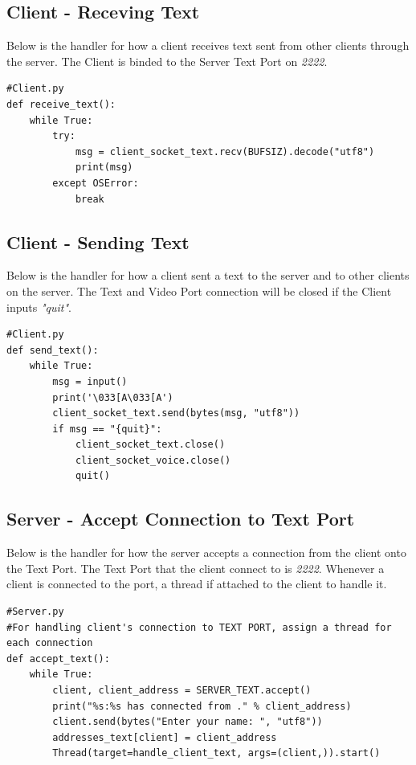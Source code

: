 \documentclass[a4paper,11pt]{article}
\begin{document}
\subsection{Client - Receving Text }
Below is the handler for how a client receives text sent from other clients through the server. The Client is binded to the Server Text Port on \textit{2222}.
\begin{mdframed}[backgroundcolor=light-gray, roundcorner=30pt,leftmargin=1, rightmargin=1, innerleftmargin=5, innertopmargin=-3,innerbottommargin=5, outerlinewidth=1, linecolor=light-gray]
\begin{lstlisting}
#Client.py
def receive_text():
	while True:
		try:
			msg = client_socket_text.recv(BUFSIZ).decode("utf8")
			print(msg)
		except OSError:
			break
\end{lstlisting}
\end{mdframed}

\subsection{Client - Sending Text}
Below is the handler for how a client sent a text to the server and to other clients on the server. The Text and Video Port connection will be closed if the Client inputs \textit{"quit"}.
\begin{mdframed}[backgroundcolor=light-gray, roundcorner=30pt,leftmargin=1, rightmargin=1, innerleftmargin=5, innertopmargin=-3,innerbottommargin=5, outerlinewidth=1, linecolor=light-gray]
\begin{lstlisting}
#Client.py
def send_text():
	while True:
		msg = input()
		print('\033[A\033[A')
		client_socket_text.send(bytes(msg, "utf8"))
		if msg == "{quit}":
			client_socket_text.close()
			client_socket_voice.close()
			quit()
\end{lstlisting}
\end{mdframed}

\subsection{Server - Accept Connection to Text Port}
Below is the handler for how the server accepts a connection from the client onto the Text Port. The Text Port that the client connect to is \textit{2222}. Whenever a client is connected to the port, a thread if attached to the client to handle it.
\begin{mdframed}[backgroundcolor=light-gray, roundcorner=30pt,leftmargin=1, rightmargin=1, innerleftmargin=5, innertopmargin=-3,innerbottommargin=5, outerlinewidth=1, linecolor=light-gray]
\begin{lstlisting}
#Server.py
#For handling client's connection to TEXT PORT, assign a thread for each connection
def accept_text():
	while True:
		client, client_address = SERVER_TEXT.accept()
		print("%s:%s has connected from ." % client_address)
		client.send(bytes("Enter your name: ", "utf8"))
		addresses_text[client] = client_address
		Thread(target=handle_client_text, args=(client,)).start()

\end{lstlisting}
\end{mdframed}
\end{document}
